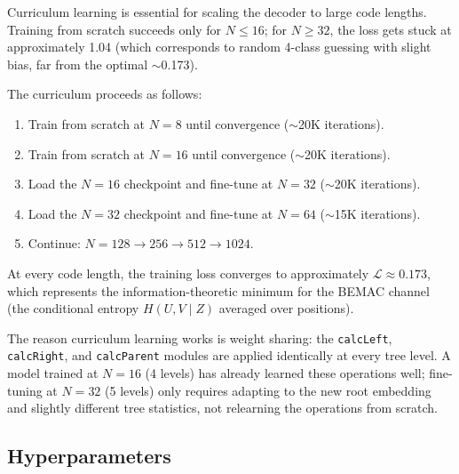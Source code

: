 \documentclass[11pt,a4paper]{article}
\begin{document}
Curriculum learning is essential for scaling the decoder to large code lengths. Training from scratch succeeds only for $N \leq 16$; for $N \geq 32$, the loss gets stuck at approximately 1.04 (which corresponds to random 4-class guessing with slight bias, far from the optimal $\sim$0.173).

The curriculum proceeds as follows:
\begin{enumerate}
    \item Train from scratch at $N = 8$ until convergence ($\sim$20K iterations).
    \item Train from scratch at $N = 16$ until convergence ($\sim$20K iterations).
    \item Load the $N = 16$ checkpoint and fine-tune at $N = 32$ ($\sim$20K iterations).
    \item Load the $N = 32$ checkpoint and fine-tune at $N = 64$ ($\sim$15K iterations).
    \item Continue: $N = 128 \to 256 \to 512 \to 1024$.
\end{enumerate}

At every code length, the training loss converges to approximately $\mathcal{L} \approx 0.173$, which represents the information-theoretic minimum for the BEMAC channel (the conditional entropy $H(U, V \mid Z)$ averaged over positions).

The reason curriculum learning works is weight sharing: the \texttt{calcLeft}, \texttt{calcRight}, and \texttt{calcParent} modules are applied identically at every tree level. A model trained at $N = 16$ (4 levels) has already learned these operations well; fine-tuning at $N = 32$ (5 levels) only requires adapting to the new root embedding and slightly different tree statistics, not relearning the operations from scratch.

\subsection{Hyperparameters}
\end{document}
